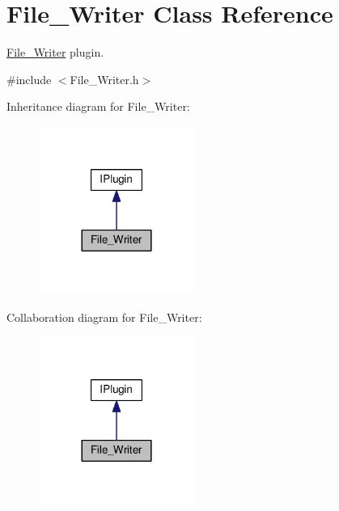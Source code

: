 \hypertarget{class_file___writer}{}\section{File\+\_\+\+Writer Class Reference}
\label{class_file___writer}


\hyperlink{class_file___writer}{File\+\_\+\+Writer} plugin.  




{\ttfamily \#include $<$File\+\_\+\+Writer.\+h$>$}



Inheritance diagram for File\+\_\+\+Writer\+:\nopagebreak
\begin{figure}[H]
\begin{center}
\leavevmode
\includegraphics[width=144pt]{class_file___writer__inherit__graph}
\end{center}
\end{figure}


Collaboration diagram for File\+\_\+\+Writer\+:\nopagebreak
\begin{figure}[H]
\begin{center}
\leavevmode
\includegraphics[width=144pt]{class_file___writer__coll__graph}
\end{center}
\end{figure}
